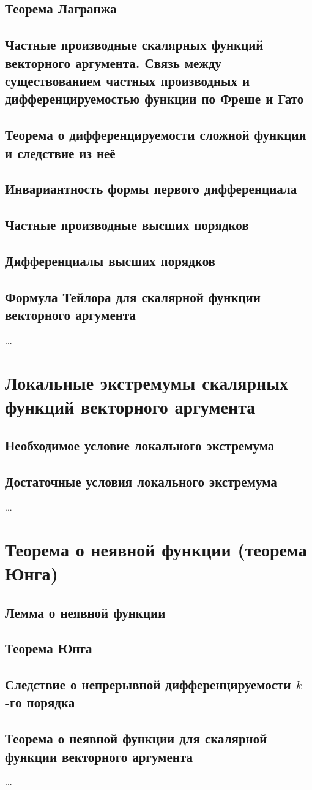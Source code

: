 \subsection{Теорема Лагранжа}
\subsection{Частные производные скалярных функций векторного аргумента. Связь между существованием частных производных и дифференцируемостью функции по Фреше и Гато}
\subsection{Теорема о дифференцируемости сложной функции и следствие из неё}
\subsection{Инвариантность формы первого дифференциала}
\subsection{Частные производные высших порядков}
\subsection{Дифференциалы высших порядков}
\subsection{Формула Тейлора для скалярной функции векторного аргумента}

...

\section{Локальные экстремумы скалярных функций векторного аргумента}
\subsection{Необходимое условие локального экстремума}
\subsection{Достаточные условия локального экстремума}

...

\section{Теорема о неявной функции (теорема Юнга)}
\subsection{Лемма о неявной функции}
\subsection{Теорема Юнга}
\subsection{Следствие о непрерывной дифференцируемости $k$-го порядка}
\subsection{Теорема о неявной функции для скалярной функции векторного аргумента}
...

